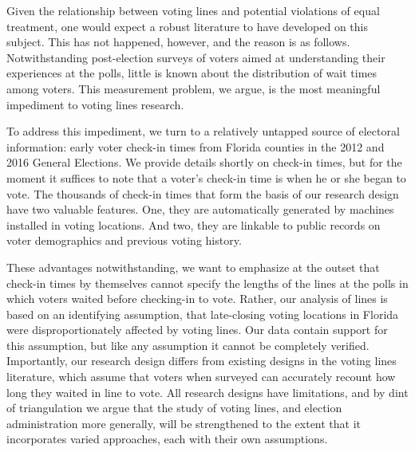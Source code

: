 \documentclass[12pt,titlepage]{article}
\begin{document}
Given the relationship between voting lines and potential violations
of equal treatment, one would expect a robust literature to
have developed on this subject.  This has not happened, however, and
the reason is as follows. Notwithstanding post-election surveys of
voters aimed at understanding their experiences at the polls, little
is known about the distribution of wait times among voters. This
measurement problem, we argue, is the most meaningful impediment to
voting lines research.

To address this impediment, we turn to a relatively untapped source of
electoral information: early voter check-in times from Florida
counties in the 2012 and 2016 General Elections. We provide details
shortly on check-in times, but for the moment it suffices to note that
a voter's check-in time is when he or she began to vote. The thousands
of check-in times that form the basis of our research design have two
valuable features. One, they are automatically generated by machines
installed in voting locations. And two, they are linkable to public
records on voter demographics and previous voting history.

These advantages notwithstanding, we want to emphasize at the outset
that check-in times by themselves cannot specify the lengths of the
lines at the polls in which voters waited before checking-in to vote.
Rather, our analysis of lines is based on an identifying assumption,
that late-closing voting locations in Florida were disproportionately
affected by voting lines. Our data contain support for this
assumption, but like any assumption it cannot be completely verified.
Importantly, our research design differs from existing designs in the
voting lines literature, which assume that voters when surveyed can
accurately recount how long they waited in line to vote. All research
designs have limitations, and by dint of triangulation we argue that
the study of voting lines, and election administration more generally,
will be strengthened to the extent that it incorporates varied
approaches, each with their own assumptions.

\end{document}
